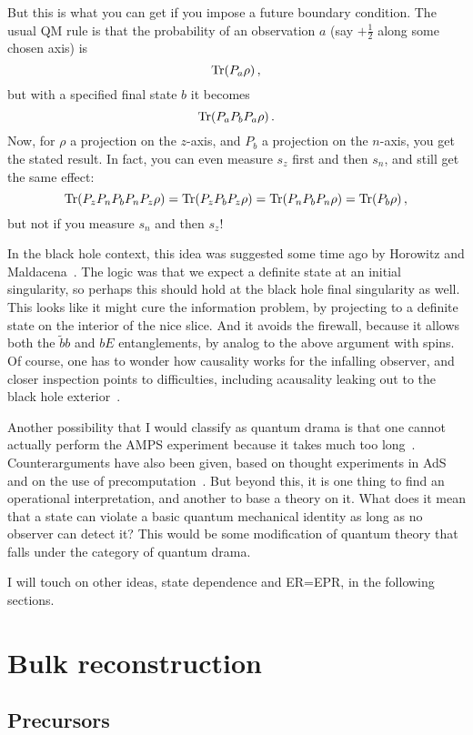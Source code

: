 \documentclass[12pt]{article}
\newcommand{\be}{\begin{equation}}
\newcommand{\ee}{\end{equation}}
\begin{document}
But this is what you can get if you impose a future boundary condition.  The usual QM rule is that the probability of an observation $a$ (say $+\frac12$ along some chosen axis) is 
\be
{\rm Tr}(P_a\rho) \,,
\ee
but with a specified final state $b$ it becomes
\be
{\rm Tr}(P_a P_b P_a\rho) \,.
\ee
Now, for $\rho$ a projection on the $z$-axis, and $P_b$ a projection on the $n$-axis, you get the stated result.  In fact, you can even measure $s_z$ first and then $s_n$, and still get the same effect:
\be
{\rm Tr}(P_z P_n P_b P_n P_z \rho) = {\rm Tr}(P_z P_b P_z\rho) = {\rm Tr}(P_n P_b P_n\rho) = {\rm Tr}(P_b\rho)  \,,
\ee
but not if you measure $s_n$ and then $s_z$!

In the black hole context, this idea was suggested some time ago by Horowitz and Maldacena~\cite{Horowitz:2003he}.  The logic was that we expect a definite state at an initial singularity, so perhaps this should hold at the black hole final singularity as well.  This looks like it might cure the information problem, by projecting to a definite state on the interior of the nice slice.  And it avoids the firewall, because it allows both the $\tilde bb$ and $bE$ entanglements, by analog to the above argument with spins.  Of course, one has to wonder how causality works for the infalling observer, and closer inspection points to difficulties, including acausality leaking out to the black hole exterior~\cite{Bousso:2013uka,Lloyd:2013bza}.

Another possibility that I would classify as quantum drama is that one cannot actually perform the AMPS experiment because it takes much too long~\cite{Harlow:2013tf}.  Counterarguments have also been given, based on thought experiments in AdS~\cite{AMPSS} and on the use of precomputation~\cite{OU}.  But beyond this, it is one thing to find an operational interpretation, and another to base a theory on it.  What does it mean that a state can violate a basic quantum mechanical identity as long as no observer can detect it?  This would be some modification of quantum theory that falls under the category of quantum drama.

I will touch on other ideas, state dependence and ER=EPR,  in the following sections.

\section{Bulk reconstruction}

\subsection{Precursors}
\end{document}
